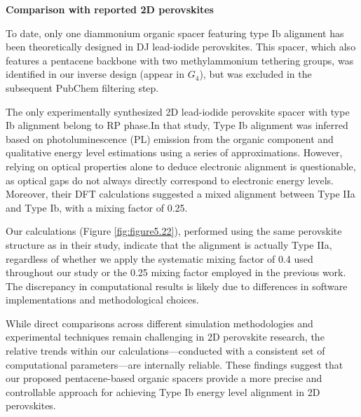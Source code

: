 \textbf{Comparison with reported 2D perovskites}

To date, only one diammonium organic spacer featuring type Ib alignment has been theoretically designed in DJ lead-iodide perovskites\cite{RN2}. This spacer, which also features a pentacene backbone with two methylammonium tethering groups, was identified in our inverse design (appear in $G_4$), but was excluded in the subsequent PubChem filtering step. 

The only experimentally synthesized 2D lead-iodide perovskite spacer with type Ib alignment belong to RP phase\cite{RN20}.In that study, Type Ib alignment was inferred based on photoluminescence (PL) emission from the organic component and qualitative energy level estimations using a series of approximations. However, relying on optical properties alone to deduce electronic alignment is questionable, as optical gaps do not always directly correspond to electronic energy levels. Moreover, their DFT calculations suggested a mixed alignment between Type IIa and Type Ib, with a mixing factor of 0.25. 

Our calculations (Figure \ref{fig:figure5.22}), performed using the same perovskite structure as in their study, indicate that the alignment is actually Type IIa, regardless of whether we apply the systematic mixing factor of 0.4 used throughout our study or the 0.25 mixing factor employed in the previous work. The discrepancy in computational results is likely due to differences in software implementations and methodological choices.

While direct comparisons across different simulation methodologies and experimental techniques remain challenging in 2D perovskite research\cite{RN38}, the relative trends within our calculations—conducted with a consistent set of computational parameters—are internally reliable. These findings suggest that our proposed pentacene-based organic spacers provide a more precise and controllable approach for achieving Type Ib energy level alignment in 2D perovskites.

